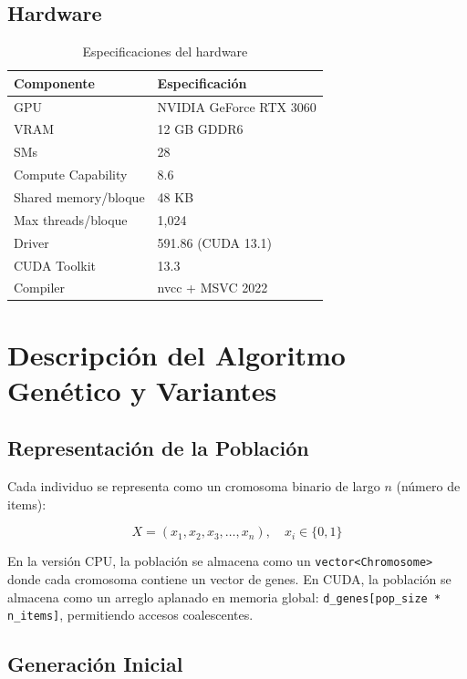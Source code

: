 \documentclass[12pt,a4paper]{article}
\begin{document}
\subsection{Hardware}

\begin{table}[H]
\centering
\caption{Especificaciones del hardware}
\begin{tabular}{ll}
\toprule
\textbf{Componente} & \textbf{Especificaci\'on} \\
\midrule
GPU & NVIDIA GeForce RTX 3060 \\
VRAM & 12 GB GDDR6 \\
SMs & 28 \\
Compute Capability & 8.6 \\
Shared memory/bloque & 48 KB \\
Max threads/bloque & 1,024 \\
Driver & 591.86 (CUDA 13.1) \\
CUDA Toolkit & 13.3 \\
Compiler & nvcc + MSVC 2022 \\
\bottomrule
\end{tabular}
\end{table}

\section{Descripci\'on del Algoritmo Gen\'etico y Variantes}

\subsection{Representaci\'on de la Poblaci\'on}

Cada individuo se representa como un cromosoma binario de largo $n$ (n\'umero de items):

\[
X = (x_1, x_2, x_3, \ldots, x_n), \quad x_i \in \{0, 1\}
\]

En la versi\'on CPU, la poblaci\'on se almacena como un \texttt{vector<Chromosome>} donde cada cromosoma contiene un vector de genes. En CUDA, la poblaci\'on se almacena como un arreglo aplanado en memoria global: \texttt{d\_genes[pop\_size * n\_items]}, permitiendo accesos coalescentes.

\subsection{Generaci\'on Inicial}
\end{document}
